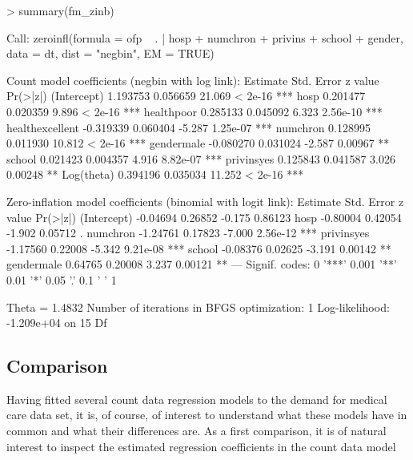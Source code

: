 \documentclass{Z}
\begin{document}
\begin{Schunk}
\begin{Sinput}
> summary(fm_zinb)
\end{Sinput}
\begin{Soutput}
Call:
zeroinfl(formula = ofp ~ . | hosp + numchron + privins + school + gender, 
    data = dt, dist = "negbin", EM = TRUE)


Count model coefficients (negbin with log link):
                 Estimate Std. Error z value Pr(>|z|)    
(Intercept)      1.193753   0.056659  21.069  < 2e-16 ***
hosp             0.201477   0.020359   9.896  < 2e-16 ***
healthpoor       0.285133   0.045092   6.323 2.56e-10 ***
healthexcellent -0.319339   0.060404  -5.287 1.25e-07 ***
numchron         0.128995   0.011930  10.812  < 2e-16 ***
gendermale      -0.080270   0.031024  -2.587  0.00967 ** 
school           0.021423   0.004357   4.916 8.82e-07 ***
privinsyes       0.125843   0.041587   3.026  0.00248 ** 
Log(theta)       0.394196   0.035034  11.252  < 2e-16 ***

Zero-inflation model coefficients (binomial with logit link):
            Estimate Std. Error z value Pr(>|z|)    
(Intercept) -0.04694    0.26852  -0.175  0.86123    
hosp        -0.80004    0.42054  -1.902  0.05712 .  
numchron    -1.24761    0.17823  -7.000 2.56e-12 ***
privinsyes  -1.17560    0.22008  -5.342 9.21e-08 ***
school      -0.08376    0.02625  -3.191  0.00142 ** 
gendermale   0.64765    0.20008   3.237  0.00121 ** 
---
Signif. codes:  0 '***' 0.001 '**' 0.01 '*' 0.05 '.' 0.1 ' ' 1 

Theta = 1.4832 
Number of iterations in BFGS optimization: 1 
Log-likelihood: -1.209e+04 on 15 Df
\end{Soutput}
\end{Schunk}


\subsection{Comparison}

Having fitted several count data regression models to the demand for medical care
data set, it is, of course, of interest to understand what these models have
in common and what their differences are. As a first comparison, it is of natural
interest to inspect the estimated regression coefficients in the count data model
\end{document}
